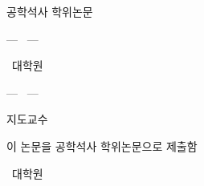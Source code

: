 \begin{titlepage}
\begin{center}
\vspace*{8mm}
{\large 공학석사 학위논문\par}
\vspace{30mm}
{\LARGE\bfseries\ThesisTitleKo\par}
\vspace{5mm}
{\Large --- \ThesisSubtitleKo\ ---\par}
\vspace{12mm}
{\large \ThesisTitleEn\par}
\vspace{2mm}
{\normalsize \ThesisSubtitleEn\par}
\vfill
{\large \DegreeDate\par}
\vspace{14mm}
{\large \UniversityKo\ 대학원\par}
\vspace{2mm}
{\large \DepartmentKo\par}
\vspace{8mm}
{\Large \AuthorKo\par}
\vspace*{10mm}
\end{center}
\end{titlepage}

\begin{titlepage}
\begin{center}
\vspace*{20mm}
{\LARGE\bfseries\ThesisTitleKo\par}
\vspace{5mm}
{\Large --- \ThesisSubtitleKo\ ---\par}
\vspace{30mm}
{\large 지도교수\quad \AdvisorKo\par}
\vspace{20mm}
{\large 이 논문을 공학석사 학위논문으로 제출함\par}
\vspace{4mm}
{\large \SubmitDate\par}
\vfill
{\large \UniversityKo\ 대학원\par}
\vspace{2mm}
{\large \DepartmentKo\par}
\vspace{8mm}
{\Large \AuthorKo\par}
\vspace*{10mm}
\end{center}
\end{titlepage}
